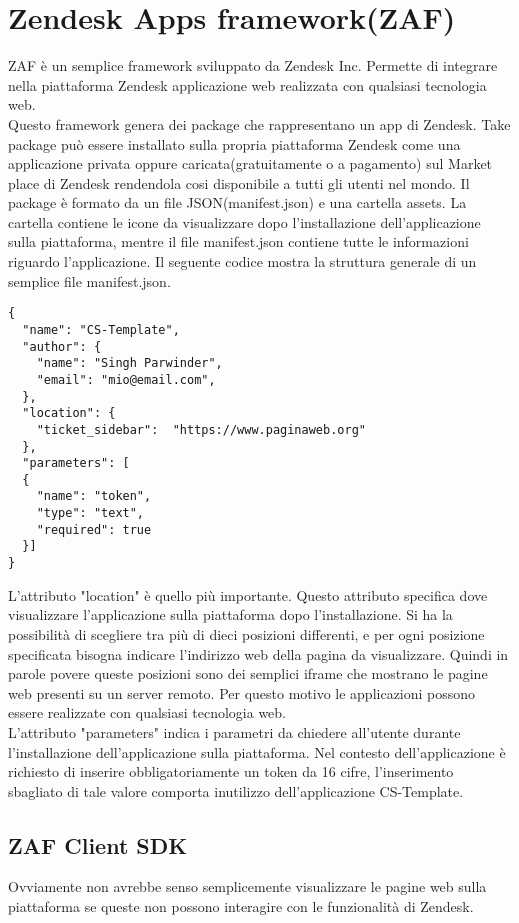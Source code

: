 \section{Zendesk Apps framework(ZAF)}
ZAF è un semplice framework sviluppato da Zendesk Inc. Permette di integrare nella piattaforma Zendesk applicazione web realizzata con qualsiasi tecnologia web. 
\\

Questo framework genera dei package che rappresentano un app di Zendesk.
Take package può essere installato sulla propria piattaforma Zendesk come una applicazione privata oppure caricata(gratuitamente o a pagamento) sul Market place di Zendesk rendendola cosi disponibile a tutti gli utenti nel mondo. Il package è formato da un file JSON(manifest.json) e una cartella assets. La cartella contiene le icone da visualizzare dopo l'installazione dell'applicazione sulla piattaforma, mentre il file manifest.json contiene tutte le informazioni riguardo l'applicazione. Il seguente codice mostra la struttura generale di un semplice file manifest.json. \\
\begin{lstlisting}
{
  "name": "CS-Template",
  "author": {
	"name": "Singh Parwinder",
	"email": "mio@email.com",
  },
  "location": {
	"ticket_sidebar":  "https://www.paginaweb.org"
  },	
  "parameters": [
  {
    "name": "token",
	"type": "text",
	"required": true
  }]
}
\end{lstlisting}
L'attributo "location" è quello più importante. Questo attributo specifica dove visualizzare l'applicazione sulla piattaforma dopo l'installazione. Si ha la possibilità di scegliere tra più di dieci posizioni differenti, e per ogni posizione specificata bisogna indicare l'indirizzo web della pagina da visualizzare. Quindi in parole povere queste posizioni sono dei semplici iframe che mostrano le pagine web presenti su un server remoto.   Per questo motivo le applicazioni possono essere realizzate con qualsiasi tecnologia web. 
\\

L'attributo "parameters" indica i parametri da chiedere all'utente durante l'installazione dell'applicazione sulla piattaforma. Nel contesto dell'applicazione è richiesto di inserire obbligatoriamente un token da 16 cifre, l'inserimento sbagliato di tale valore comporta inutilizzo dell'applicazione CS-Template. 

\subsection{ZAF Client SDK}
Ovviamente non avrebbe senso semplicemente visualizzare le pagine web sulla piattaforma se queste non possono interagire con le funzionalità di Zendesk. 
\\

